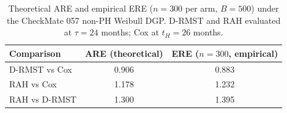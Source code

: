 \begin{table}[ht]
\centering
\caption{Theoretical ARE and empirical ERE ($n=300$ per arm, $B=500$)
  under the CheckMate 057 non-PH Weibull DGP.
  D-RMST and RAH evaluated at $\tau=24$ months; Cox at $t_H=26$ months.}
\label{tab:are-ere}
\medskip
\begin{tabular}{lcc}
\toprule
Comparison & ARE (theoretical) & ERE ($n=300$, empirical) \\
\midrule
D-RMST vs Cox & 0.906 & 0.883 \\
RAH vs Cox & 1.178 & 1.232 \\
RAH vs D-RMST & 1.300 & 1.395 \\
\bottomrule
\end{tabular}
\end{table}
